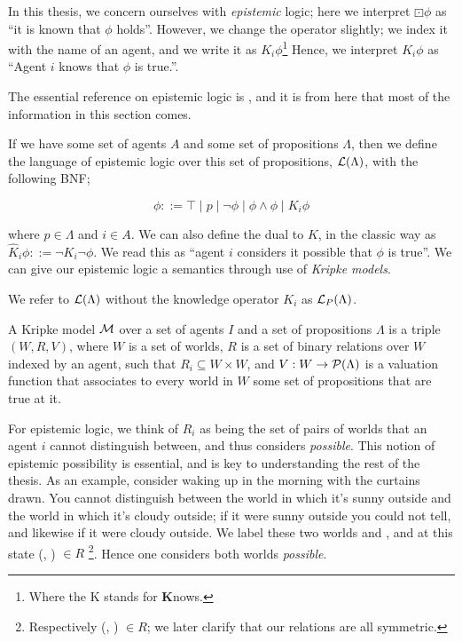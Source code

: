 \documentclass[10pt, a4paper]{report}
\begin{document}
In this thesis, we concern ourselves with \emph{epistemic} logic; here we
interpret $\boxdot \phi$ as ``it is known that $\phi$ holds''. However, we
change the operator slightly; we index it with the name of an agent, and we
write it as $K_i \phi$\footnote{Where the K stands for \textbf{K}nows.} Hence,
we interpret $K_i \phi$ as ``Agent $i$ knows that $\phi$ is true.''.

The essential reference on epistemic logic is \cite{ReasoningAboutKnowledge},
and it is from here that most of the information in this section comes.
  
If we have some set of agents $A$ and some set of propositions $\Lambda$, then
we define the language of epistemic logic over this set of propositions,
$\mathcal{L}(\Lambda)$, with the following BNF;

\begin{equation*}
  \phi ::= \top \mid p \mid \neg \phi \mid \phi \land \phi \mid K_i \phi
\end{equation*}

\noindent where $p \in \Lambda$ and $i \in A$. We can also define the dual to
$K$, in the classic way as $\widehat K_i \phi ::= \neg K_i \neg \phi$. We read
this as ``agent $i$ considers it possible that $\phi$ is true''. We can give our
epistemic logic a semantics through use of \emph{Kripke models}.

We refer to $\mathcal{L}(\Lambda)$ without the knowledge operator $K_i$ as
$\mathcal{L}_P(\Lambda)$.

\bigskip

A Kripke model $\mathcal{M}$ over a set of agents $I$ and a set of propositions
$\Lambda$ is a triple $(W, R, V)$, where $W$ is a set of worlds, $R$ is a set of
binary relations over $W$ indexed by an agent, such that $R_i \subseteq W \times
W$, and $V : W \rightarrow \mathcal{P}(\Lambda)$ is a valuation function that
associates to every world in $W$ some set of propositions that are true at it.

For epistemic logic, we think of $R_i$ as being the set of pairs of worlds that
an agent $i$ cannot distinguish between, and thus considers \emph{possible}.
This notion of epistemic possibility is essential, and is key to understanding
the rest of the thesis. As an example, consider waking up in the morning with
the curtains drawn. You cannot distinguish between the world in which it's sunny
outside and the world in which it's cloudy outside; if it were sunny outside you
could not tell, and likewise if it were cloudy outside. We label these two
worlds \Sun and \Cloud, and at this state (\Sun, \Cloud) $\in R$
\footnote{Respectively (\Cloud, \Sun) $\in R$; we later clarify that our
  relations are all symmetric.}. Hence one
considers both worlds \emph{possible}.
\end{document}
